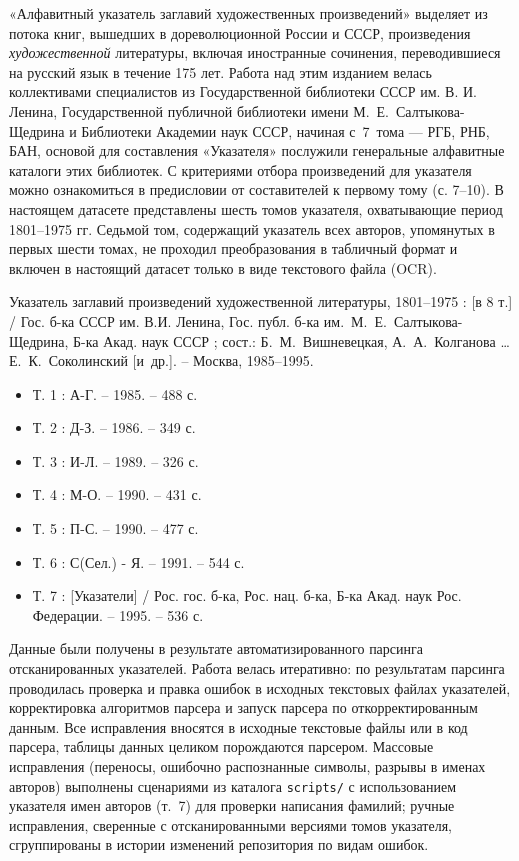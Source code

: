 \documentclass[
  russian,
]{article}
\providecommand{\tightlist}{%
  \setlength{\itemsep}{0pt}\setlength{\parskip}{0pt}}
\begin{document}
«Алфавитный указатель заглавий художественных произведений» выделяет из
потока книг, вышедших в дореволюционной России и СССР, произведения
\emph{художественной} литературы, включая иностранные сочинения,
переводившиеся на русский язык в течение 175 лет. Работа над этим
изданием велась коллективами специалистов из Государственной библиотеки
СССР им. В. И. Ленина, Государственной публичной библиотеки имени
М.~Е.~Салтыкова-Щедрина и Библиотеки Академии наук СССР, начиная
с~7~тома --- РГБ, РНБ, БАН, основой для составления «Указателя»
послужили генеральные алфавитные каталоги этих библиотек. С критериями
отбора произведений для указателя можно ознакомиться в предисловии от
составителей к первому тому (с. 7--10). В настоящем датасете
представлены шесть томов указателя, охватывающие период 1801--1975 гг.
Седьмой том, содержащий указатель всех авторов, упомянутых в первых
шести томах, не проходил преобразования в табличный формат и включен в
настоящий датасет только в виде текстового файла (OCR).

Указатель заглавий произведений художественной литературы, 1801--1975 :
{[}в 8 т.{]} / Гос. б-ка СССР им. В.И. Ленина, Гос. публ. б-ка
им.~М.~Е.~Салтыкова-Щедрина, Б-ка Акад. наук СССР ; сост.:
Б.~М.~Вишневецкая, А.~А.~Колганова \ldots{} Е.~К.~Соколинский
{[}и~др.{]}. -- Москва, 1985--1995.

\begin{itemize}
\tightlist
\item
  Т. 1 : А-Г. -- 1985. -- 488 с.
\item
  Т. 2 : Д-З. -- 1986. -- 349 с.
\item
  Т. 3 : И-Л. -- 1989. -- 326 с.
\item
  Т. 4 : М-О. -- 1990. -- 431 с.
\item
  Т. 5 : П-С. -- 1990. -- 477 с.
\item
  Т. 6 : С(Сел.) - Я. -- 1991. -- 544 с.
\item
  Т. 7 : {[}Указатели{]} / Рос. гос. б-ка, Рос. нац. б-ка, Б-ка Акад.
  наук Рос. Федерации. -- 1995. -- 536 с.
\end{itemize}

Данные были получены в результате автоматизированного парсинга
отсканированных указателей. Работа велась итеративно: по результатам
парсинга проводилась проверка и правка ошибок в исходных текстовых
файлах указателей, корректировка алгоритмов парсера и запуск парсера по
откорректированным данным. Все исправления вносятся в исходные текстовые
файлы или в код парсера, таблицы данных целиком порождаются парсером.
Массовые исправления (переносы, ошибочно распознанные символы, разрывы в
именах авторов) выполнены сценариями из каталога \texttt{scripts/} с
использованием указателя имен авторов (т.~7) для проверки написания
фамилий; ручные исправления, сверенные с отсканированными версиями томов
указателя, сгруппированы в истории изменений репозитория по видам
ошибок.
\end{document}
